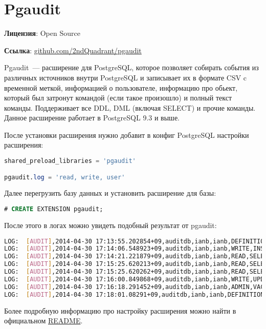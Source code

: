 \section{Pgaudit}
\textbf{Лицензия}: Open Source

\textbf{Ссылка}: \href{https://github.com/2ndQuadrant/pgaudit}{github.com/2ndQuadrant/pgaudit}

Pgaudit~--- расширение для PostgreSQL, которое позволяет собирать события из различных источников внутри PostgreSQL и записывает их в формате CSV c временной меткой, информацией о пользователе, информацию про обьект, который был затронут командой (если такое произошло) и полный текст команды. Поддерживает все DDL, DML (включая SELECT) и прочие команды. Данное расширение работает в PostgreSQL 9.3 и выше.

После установки расширения нужно добавит в конфиг PostgreSQL настройки расширения:

\begin{lstlisting}[language=SQL,label=lst:pgaudit1,caption=Pgaudit]
shared_preload_libraries = 'pgaudit'

pgaudit.log = 'read, write, user'
\end{lstlisting}

Далее перегрузить базу данных и установить расширение для базы:

\begin{lstlisting}[language=SQL,label=lst:pgaudit2,caption=Pgaudit]
# CREATE EXTENSION pgaudit;
\end{lstlisting}

После этого в логах можно увидеть подобный результат от pgaudit:

\begin{lstlisting}[language=Bash,label=lst:pgaudit3,caption=Pgaudit]
LOG:  [AUDIT],2014-04-30 17:13:55.202854+09,auditdb,ianb,ianb,DEFINITION,CREATE TABLE,TABLE,public.x,CREATE  TABLE  public.x (a pg_catalog.int4   , b pg_catalog.int4   )   WITH (oids=OFF)
LOG:  [AUDIT],2014-04-30 17:14:06.548923+09,auditdb,ianb,ianb,WRITE,INSERT,TABLE,public.x,INSERT INTO x VALUES(1,1);
LOG:  [AUDIT],2014-04-30 17:14:21.221879+09,auditdb,ianb,ianb,READ,SELECT,TABLE,public.x,SELECT * FROM x;
LOG:  [AUDIT],2014-04-30 17:15:25.620213+09,auditdb,ianb,ianb,READ,SELECT,VIEW,public.v_x,SELECT * from v_x;
LOG:  [AUDIT],2014-04-30 17:15:25.620262+09,auditdb,ianb,ianb,READ,SELECT,TABLE,public.x,SELECT * from v_x;
LOG:  [AUDIT],2014-04-30 17:16:00.849868+09,auditdb,ianb,ianb,WRITE,UPDATE,TABLE,public.x,UPDATE x SET a=a+1;
LOG:  [AUDIT],2014-04-30 17:16:18.291452+09,auditdb,ianb,ianb,ADMIN,VACUUM,,,VACUUM x;
LOG:  [AUDIT],2014-04-30 17:18:01.08291+09,auditdb,ianb,ianb,DEFINITION,CREATE FUNCTION,FUNCTION,public.func_x(),CREATE  FUNCTION public.func_x() RETURNS  pg_catalog.int4 LANGUAGE sql  VOLATILE  CALLED ON NULL INPUT SECURITY INVOKER COST 100.000000   AS $dprs_$SELECT a FROM x LIMIT 1;$dprs_$
\end{lstlisting}

Более подробную информацию про настройку расширения можно найти в официальном \href{https://github.com/2ndQuadrant/pgaudit#configuration}{README}.
